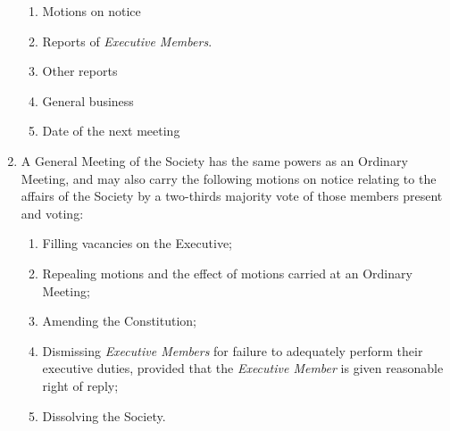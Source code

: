 \documentclass[11pt]{article}
\begin{document}
\begin{enumerate}[\thesection .1]
\begin{enumerate}[\hspace{5mm}1.]
    	\item Motions on notice
    	\item Reports of \textit{Executive Members}.
    	\item Other reports
    	\item General business
    	\item Date of the next meeting
    \end{enumerate}
    \item A General Meeting of the Society has the same powers as an Ordinary Meeting, and may also carry the following motions on notice relating to the affairs of the Society by a two-thirds majority vote of those members present and voting:
    \begin{enumerate}
        \item Filling vacancies on the Executive;
        \item Repealing motions and the effect of motions carried at an Ordinary Meeting;
        \item Amending the Constitution;
        \item Dismissing \textit{Executive Members} for failure to adequately perform their executive duties, provided that the \textit{Executive Member} is given reasonable right of reply;
        \item Dissolving the Society.
    \end{enumerate}
\end{enumerate}
\end{document}
